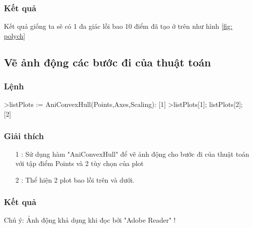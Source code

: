 \documentclass[12pt]{article}
\begin{document}
            \subsubsection*{Kết quả}
              Kết quả giống ta sẽ có 1 đa giác lồi bao 10 điểm đã tạo ở trên như hình \ref{fig: polych}
              \newpage
        \subsection*{Vẽ ảnh động các bước đi của thuật toán}
          \subsubsection*{Lệnh}
            \begin{spverbatim}
    >listPlots := AniConvexHull(Points,Axes,Scaling):  [1]
    >listPlots[1]; listPlots[2]; [2]
            \end{spverbatim}
          \subsubsection*{Giải thích}
            \begin{itemize}
              \item [1]: Sử dụng hàm "AniConvexHull" để vẽ ảnh động cho bước đi của thuật toán với tập điểm Points và 2 tùy chọn của plot
              \item [2]: Thể hiện 2 plot bao lồi trên và dưới.
            \end{itemize}
        \subsubsection*{Kết quả}
          \begin{frame}{}
            \centering
          \end{frame}
          \begin{center}
            Chú ý: Ảnh động khả dụng khi đọc bởi "Adobe Reader" !
          \end{center}
          \newpage
\end{document}
